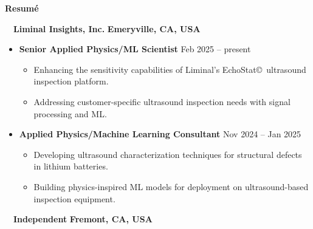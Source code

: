 \documentclass[10.5pt]{article}
\begin{document}
\begin{center}
	\textbf{Resum\'{e}}
\end{center}
\begin{minipage}[t]{0.85\textwidth}\vspace{0pt}
    \vspace{0.3cm}
\end{minipage}
\begin{minipage}[t]{0.15\textwidth}\vspace{0pt}
\end{minipage}
\vspace{-0.1cm} 
~~{\color{black}\textbf{Liminal Insights, Inc.} \hfill  \textbf{Emeryville, CA, USA}}\par
\begin{itemize}
    \item
    \textbf{Senior Applied Physics/ML Scientist}
    \hfill  {Feb 2025 -- present} \par
        \begin{itemize}
            \item Enhancing the sensitivity capabilities of Liminal's EchoStat\copyright~ultrasound inspection platform. 
            \item Addressing customer-specific ultrasound inspection needs with signal processing and ML. 
        \end{itemize}
    \item
        \textbf{Applied Physics/Machine Learning Consultant}
        \hfill  {Nov 2024 -- Jan 2025} \par
        \begin{itemize}
            \item Developing ultrasound characterization techniques for structural defects in lithium batteries. 
            \item Building physics-inspired ML models for deployment on ultrasound-based inspection equipment.
        \end{itemize}
\end{itemize} ~~{\color{black}\textbf{Independent} \hfill  \textbf{Fremont, CA, USA}}\par
\end{document}
